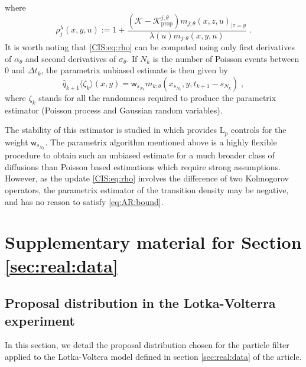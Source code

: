 \documentclass[12pt]{article}
\newcommand{\parvec}{\theta}
\newcommand{\hdhat}[1]{\widehat{q}_{#1}}
\newcommand{\eqdef}{\ensuremath{:=}}
\newcommand{\eqsp}{\;}
\begin{document}
where
\begin{equation}
\label{CIS:eq:rho}
\rho^{\lambda}_j\left(x,y,u\right)\eqdef 1+\frac{\left(\mathcal{K}-\mathcal{K}^{j,\theta}_{\mathrm{prop}}\right)m_{j;\parvec}\left(x,z,u\right)_{|z=y}}{\lambda(u)m_{j;\parvec}\left(x,y,u\right)}\eqsp.
\end{equation}
It is worth noting that \eqref{CIS:eq:rho} can be computed using only first derivatives of $\alpha_{\parvec}$ and second derivatives of $\sigma_\parvec$. 
If $N_k$ is the number of Poisson events between $0$ and $\Delta t_{k}$, the parametrix unbiased estimate is then given by 
\[
\hdhat{k+1}\langle \zeta_k\rangle(x,y) = \mathsf{w}_{s_{N_k}}m_{k;\parvec}\left(x_{s_{N_k}},y,t_{k+1} - s_{N_k}\right) \eqsp,
\]
where $\zeta_k$ stands for all the randomness required to produce the parametrix estimator (Poisson process and Gaussian random variables).

The stability of this estimator is studied in \cite{fearnhead2017continuous} which provides $\mathrm{L}_p$ controls for the weight $\mathsf{w}_{s_{N_k}}$. 
The parametrix algorithm mentioned above is a highly flexible procedure to obtain such an unbiased estimate for a much broader class of diffusions than Poisson based estimations which require strong assumptions. 
However, as the update \eqref{CIS:eq:rho} involves the difference of two Kolmogorov operators, the parametrix estimator of the transition density may be negative, and has no reason to satisfy \eqref{eq:AR:bound}.

\section{Supplementary material for Section \ref{sec:real:data}}


\subsection*{Proposal distribution in the Lotka-Volterra experiment}

In this section, we detail the proposal distribution chosen for the particle filter applied to the Lotka-Voltera model defined in  section \ref{sec:real:data} of the article. 
\end{document}
